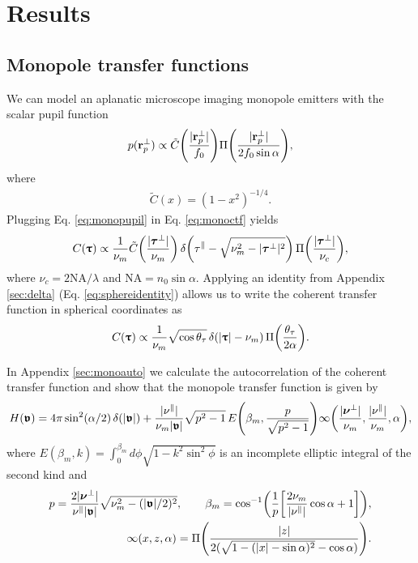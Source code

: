 \documentclass[]{osa-article}
\let\originalleft\left
\let\originalright\right
\renewcommand{\left}{\mathopen{}\mathclose\bgroup\originalleft}
\renewcommand{\right}{\aftergroup\egroup\originalright}
\newcommand{\mypar}{\parallel}
\providecommand{\rpperp}{\mathbf{r}_p^{\bot}}
\providecommand{\bs}[1]{\boldsymbol{#1}}
\providecommand{\bv}{\boldsymbol{\mathfrak{v}}}
\providecommand{\bvperp}{\bs{\nu}^{\bot}}
\providecommand{\bvpar}{\nu^{\parallel}}
\providecommand{\bt}{\bs{\uptau}}
\providecommand{\btperp}{\bs{\tau}^{\bot}}
\providecommand{\btpar}{\tau^{\mypar}}
\begin{document}

\section{Results}
\subsection{Monopole transfer functions}
We can model an aplanatic microscope imaging monopole emitters with the scalar pupil function
\begin{align}
  p(\rpperp) \propto  \tilde{C}\left(\frac{|\rpperp|}{f_0}\right)\Pi\left(\frac{|\rpperp|}{2f_0\sin\alpha}\right), \label{eq:monopupil}
\end{align}
where
\begin{align}
  \tilde{C}(x) = (1 - x^2)^{-1/4}.
\end{align}
Plugging Eq. \eqref{eq:monopupil} in Eq. \eqref{eq:monoctf} yields
\begin{align}
  C(\bt) \propto \frac{1}{\nu_m}\tilde{C}\left(\frac{|\btperp|}{\nu_m}\right)\,\delta\left(\btpar - \sqrt{\nu_m^2 - |\btperp|^2}\right)\,\Pi\left(\frac{|\btperp|}{\nu_c}\right),\label{eq:toexpand}
\end{align}
where $\nu_c = 2\text{NA}/\lambda$ and $\text{NA} = n_0\sin\alpha$. Applying an identity from Appendix \ref{sec:delta} (Eq. \eqref{eq:sphereidentity}) allows us to write the coherent transfer function in spherical coordinates as 
\begin{align}
  C(\bt) \propto \frac{1}{\nu_m}\sqrt{\cos\theta_\tau}\,\delta\left(|\bt| - \nu_m\right)\,\Pi\left(\frac{\theta_\tau}{2\alpha}\right).
\end{align}

In Appendix \ref{sec:monoauto} we calculate the autocorrelation of the coherent transfer function and show that the monopole transfer function is given by
\begin{align}
  H(\bv) = 4\pi\sin^2(\alpha/2)\,\delta(|\bv|) + \frac{|\bvpar|}{\nu_m|\bv|}\sqrt{p^2 - 1}\,E\left(\beta_m, \frac{p}{\sqrt{p^2 - 1}}\right)\infty\left(\frac{|\bvperp|}{\nu_m}, \frac{|\bvpar|}{\nu_m}, \alpha\right),
\end{align}
where $E(\beta_m, k)  = \int_0^{\beta_m} d\phi\sqrt{1 - k^2\sin^2\phi}$ is an incomplete elliptic integral of the second kind and
\begin{align}
  p = \frac{2|\bvperp|}{\bvpar|\bv|}\sqrt{\nu_m^2 - (|\bv|/2)^2},\qquad
  \beta_m = \cos^{-1}\left(\frac{1}{p}\left[\frac{2\nu_m}{|\bvpar|}\cos\alpha + 1\right]\right),\nonumber\\ \infty(x, z, \alpha) = \Pi\left(\frac{|z|}{2(\sqrt{1 - (|x| - \sin\alpha)^2} - \cos\alpha)}\right).
\end{align}
\end{document}
